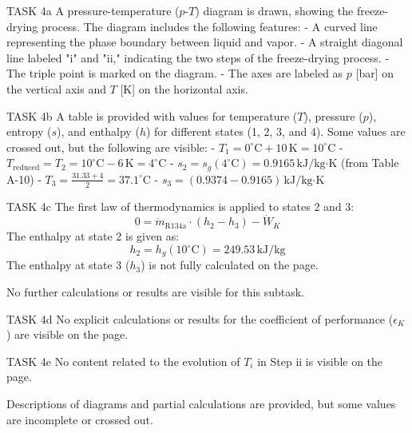 TASK 4a  
A pressure-temperature (\(p\)-\(T\)) diagram is drawn, showing the freeze-drying process. The diagram includes the following features:  
- A curved line representing the phase boundary between liquid and vapor.  
- A straight diagonal line labeled "i" and "ii," indicating the two steps of the freeze-drying process.  
- The triple point is marked on the diagram.  
- The axes are labeled as \(p\) [bar] on the vertical axis and \(T\) [K] on the horizontal axis.  

TASK 4b  
A table is provided with values for temperature (\(T\)), pressure (\(p\)), entropy (\(s\)), and enthalpy (\(h\)) for different states (1, 2, 3, and 4). Some values are crossed out, but the following are visible:  
- \(T_1 = 0^\circ\text{C} + 10 \, \text{K} = 10^\circ\text{C}\)  
- \(T_{\text{reduced}} = T_2 = 10^\circ\text{C} - 6 \, \text{K} = 4^\circ\text{C}\)  
- \(s_2 = s_g(4^\circ\text{C}) = 0.9165 \, \text{kJ/kg·K}\) (from Table A-10)  
- \(T_3 = \frac{31.33 + 4}{2} = 37.1^\circ\text{C}\)  
- \(s_3 = (0.9374 - 0.9165) \, \text{kJ/kg·K}\)  

TASK 4c  
The first law of thermodynamics is applied to states 2 and 3:  
\[
0 = \dot{m}_{\text{R134a}} \cdot (h_2 - h_3) - \dot{W}_K  
\]
The enthalpy at state 2 is given as:  
\[
h_2 = h_g(10^\circ\text{C}) = 249.53 \, \text{kJ/kg}  
\]  
The enthalpy at state 3 (\(h_3\)) is not fully calculated on the page.  

No further calculations or results are visible for this subtask.  

TASK 4d  
No explicit calculations or results for the coefficient of performance (\(\epsilon_K\)) are visible on the page.  

TASK 4e  
No content related to the evolution of \(T_i\) in Step ii is visible on the page.  

Descriptions of diagrams and partial calculations are provided, but some values are incomplete or crossed out.
